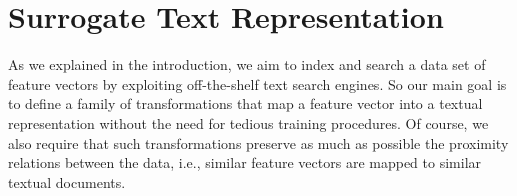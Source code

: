 

\section{Surrogate Text Representation} %
\label{sec:str:surrogate}
As we explained in the introduction, we aim to index and search a data set of feature vectors by exploiting off-the-shelf text search engines.
So our main goal is to define a family of transformations that map a feature vector into a textual representation without the need for tedious training procedures.
Of course, we also require that such transformations preserve as much as possible the proximity relations between the data, i.e., similar feature vectors are mapped to similar textual documents.

